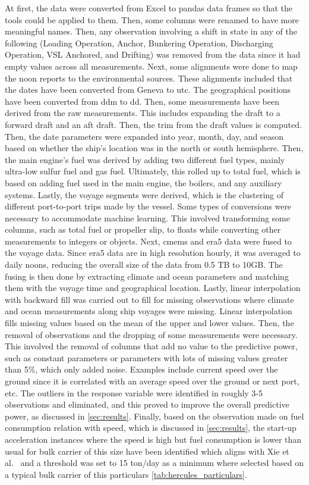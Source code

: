 At first, the data were converted from Excel to pandas data frames so that the tools could be applied to them. Then, some columns were renamed to have more meaningful names. Then, any observation involving a shift in state in any of the following (Loading Operation, Anchor, Bunkering Operation, Discharging Operation, VSL Anchored, and Drifting) was removed from the data since it had empty values across all measurements. Next, some alignments were done to map the noon reports to the environmental sources. These alignments included that the dates have been converted from Geneva to \ac{utc}. The geographical positions have been converted from \ac{ddm} to \ac{dd}.
Then, some measurements have been derived from the raw measurements. This includes expanding the draft to a forward draft and an aft draft. Then, the trim from the draft values is computed. Then, the date parameters were expanded into year, month, day, and season based on whether the ship's location was in the north or south hemisphere. Then, the main engine's fuel was derived by adding two different fuel types, mainly ultra-low sulfur fuel and gas fuel. Ultimately, this rolled up to total fuel, which is based on adding fuel used in the main engine, the boilers, and any auxiliary systems. Lastly, the voyage segments were derived, which is the clustering of different port-to-port trips made by the vessel.
Some types of conversions were necessary to accommodate machine learning. This involved transforming some columns, such as total fuel or propeller slip, to floats while converting other measurements to integers or objects.
Next, \ac{cmems} and \ac{era5} data were fused to the voyage data. Since \ac{era5} data are in high resolution hourly, it was averaged to daily noons, reducing the overall size of the data from 0.5 TB to 10GB. The fusing is then done by extracting climate and ocean parameters and matching them with the voyage time and geographical location.
Lastly, linear interpolation with backward fill was carried out to fill for missing observations where climate and ocean measurements along ship voyages were missing. Linear interpolation fills missing values based on the mean of the upper and lower values. Then, the removal of observations and the dropping of some measurements were necessary. This involved the removal of columns that add no value to the predictive power, such as constant parameters or parameters with lots of missing values greater than 5\%, which only added noise. Examples include current speed over the ground since it is correlated with an average speed over the ground or next port, etc. The outliers in the response variable were identified in roughly 3-5 observations and eliminated, and this proved to improve the overall predictive power, as discussed in \cref{sec:results}. Finally, based on the observation made on fuel consumption relation with speed, which is discussed in \cref{sec:results}, the start-up acceleration instances where the speed is high but fuel consumption is lower than usual for bulk carrier of this size have been identified which aligns with Xie et al.~\citep{xieFuelConsumptionPrediction2023} and a threshold was set to 15 ton/day as a minimum where selected based on a typical bulk carrier of this particulars \cref{tab:hercules_particulars}.
